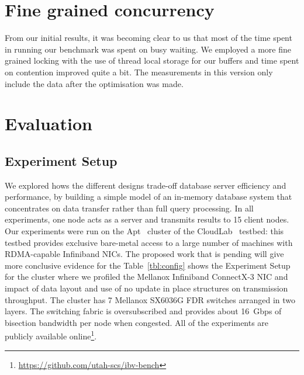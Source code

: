 \section{Fine grained concurrency}
From our initial results, it was becoming clear to us that most of the time spent 
in running our benchmark was spent on busy waiting. We employed a more fine grained 
locking with the use of thread local storage for our buffers and time spent on 
contention improved quite a bit. The measurements in this version only include the
data after the optimisation was made.

\section{Evaluation}




\subsection{Experiment Setup}

We explored hows the different designs trade-off database server efficiency and
performance, by building a simple model of an in-memory database system that
concentrates on data transfer rather than full query processing. In all experiments,
one node acts as a server and transmits results to 15 client nodes.
Our experiments were run on the Apt~\cite{Ricci+:OSR15} cluster of the
CloudLab~\cite{Cloudlab:URL} testbed: this testbed provides exclusive bare-metal
access to a large number of machines with RDMA-capable Infiniband NICs.
The proposed work that is pending will give more conclusive evidence for the 
Table~\ref{tbl:config} shows the Experiment Setup for the cluster where we profiled
the Mellanox Infiniband ConnectX-3 \textregistered NIC and impact of data layout and 
use of no update in place structures on transmission throughput. The cluster has 7
Mellanox SX6036G FDR switches arranged in two layers. The switching fabric is
oversubscribed and provides about 16~Gbps of bisection bandwidth per node
when congested. All of the experiments are
publicly available online\footnote{\url{https://github.com/utah-scs/ibv-bench}}.







